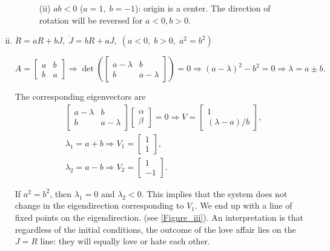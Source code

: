 \documentclass[12pt]{article}
\begin{document}
\begin{ex}
\begin{solution}
\begin{enumerate}[(i)]
\begin{figure}[h]
\begin{minipage}[t]{0.45\textwidth}
    \caption{(ii) $ab<0$ ($a=1,\;b=-1$): origin is a center. The direction of rotation will be reversed for $a<0,b>0$.}
    \label{Figure_ii_center}
  \end{minipage}
  \end{figure}

  \item $\dot{R}=aR+bJ,\;\dot{J}=bR+aJ,\;(a<0,\;b>0,\;a^2=b^2)$

  \begin{equation*}
    A=
    \begin{bmatrix}
      a & b\\
      b & a
    \end{bmatrix}
    \Rightarrow \det\left(
    \begin{bmatrix}
      a-\lambda & b\\
      b & a-\lambda
    \end{bmatrix}
    \right)=0\Rightarrow (a-\lambda)^2-b^2=0\Rightarrow \lambda=a\pm b.
  \end{equation*}

  The corresponding eigenvectors are
  \begin{align*}
    &\begin{bmatrix}
      a-\lambda & b\\
      b & a-\lambda
    \end{bmatrix}
    \begin{bmatrix}
      \alpha\\
      \beta
    \end{bmatrix}
    =0\Rightarrow V=
    \begin{bmatrix}
      1\\
      (\lambda-a)/b
    \end{bmatrix},\\
    &\lambda_1=a+b\Rightarrow V_1=\begin{bmatrix}1\\1\end{bmatrix},\\
    &\lambda_2=a-b\Rightarrow V_2=\begin{bmatrix}1\\-1\end{bmatrix}.
  \end{align*}
    
  If $a^2=b^2$, then $\lambda_1=0$ and $\lambda_2<0$. This implies that the system does not change in the eigendirection corresponding to $V_1$. We end up with a line of fixed points on the eigendirection. (see \autoref{Figure_iii}). An interpretation is that regardless of the initial conditions, the outcome of the love affair lies on the $J=R$ line: they will equally love or hate each other.
  

\end{enumerate}
\end{solution}
\end{ex}
\end{document}
